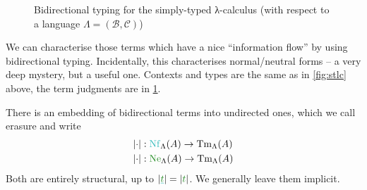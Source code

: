 \documentclass[10pt,a4paper]{notes-template}
\begin{document}
\begin{figure}
\caption{Bidirectional typing for the simply-typed λ-calculus
  (with respect to a language \(\Lambda = (\mathcal{B},\mathcal{C})\))}
\label{fig:stlc-bidir}

\end{figure}

We can characterise those terms which have a nice “information flow” by using
bidirectional typing. Incidentally, this characterises normal/neutral forms
– a very deep mystery, but a useful one. Contexts and types are the same as
in \cref{fig:stlc} above, the term judgments are in \cref{fig:stlc-bidir}.

There is an embedding of bidirectional terms into undirected ones, which we
call erasure and write
\begin{align*}
  \eras{\cdot} &\ty \Nf_{\Lambda}(A) \to \Tm_{\Lambda}(A) \\
  \eras{\cdot} &\ty \Ne_{\Lambda}(A) \to \Tm_{\Lambda}(A)
\end{align*}
Both are entirely structural, up to
  \(\eras{\ccol{\dem{\icol{t}}}} = \eras{\icol{t}}\).
We generally leave them implicit.
\end{document}
